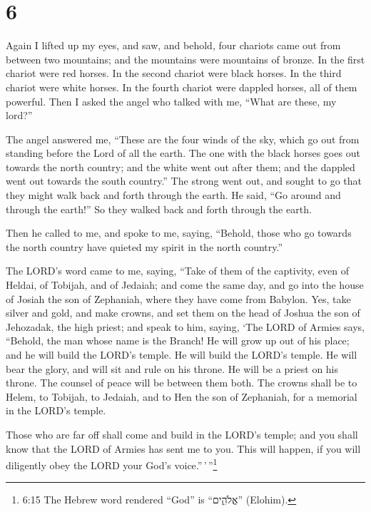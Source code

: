 \hypertarget{section-5}{%
\section{6}\label{section-5}}

 Again I lifted up my eyes, and saw, and behold, four
chariots came out from between two mountains; and the mountains were
mountains of bronze.  In the first chariot were red horses.
In the second chariot were black horses.  In the third
chariot were white horses. In the fourth chariot were dappled horses,
all of them powerful.  Then I asked the angel who talked
with me, ``What are these, my lord?''

 The angel answered me, ``These are the four winds of the
sky, which go out from standing before the Lord of all the earth.
 The one with the black horses goes out towards the north
country; and the white went out after them; and the dappled went out
towards the south country.''  The strong went out, and
sought to go that they might walk back and forth through the earth. He
said, ``Go around and through the earth!'' So they walked back and forth
through the earth.

 Then he called to me, and spoke to me, saying, ``Behold,
those who go towards the north country have quieted my spirit in the
north country.''

 The LORD's word came to me, saying,  ``Take of
them of the captivity, even of Heldai, of Tobijah, and of Jedaiah; and
come the same day, and go into the house of Josiah the son of Zephaniah,
where they have come from Babylon.  Yes, take silver and
gold, and make crowns, and set them on the head of Joshua the son of
Jehozadak, the high priest;  and speak to him, saying, `The
LORD of Armies says, ``Behold, the man whose name is the Branch! He will
grow up out of his place; and he will build the LORD's temple.
 He will build the LORD's temple. He will bear the glory,
and will sit and rule on his throne. He will be a priest on his throne.
The counsel of peace will be between them both.  The crowns
shall be to Helem, to Tobijah, to Jedaiah, and to Hen the son of
Zephaniah, for a memorial in the LORD's temple.

 Those who are far off shall come and build in the LORD's
temple; and you shall know that the LORD of Armies has sent me to you.
This will happen, if you will diligently obey the LORD your God's
voice.''\,'\,''\footnote{6:15 The Hebrew word rendered ``God'' is
  ``אֱלֹהִ֑ים'' (Elohim).}

